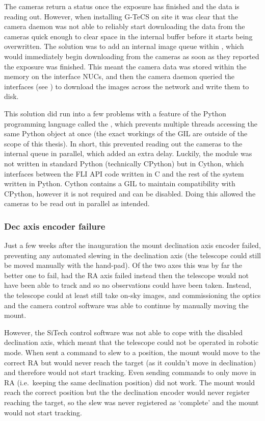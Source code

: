 \begin{colsection}
\begin{colsection}
The cameras return a  status once the exposure has finished and the data is reading out. However, when installing G-TeCS on site it was clear that the camera daemon was not able to reliably start downloading the data from the cameras quick enough to clear space in the internal buffer before it starts being overwritten. The solution was to add an internal image queue within , which would immediately begin downloading from the cameras as soon as they reported the exposure was finished. This meant the camera data was stored within the memory on the interface NUCs, and then the camera daemon queried the  interfaces (see ) to download the images across the network and write them to disk.

This solution did run into a few problems with a feature of the Python programming language called the , which prevents multiple threads accessing the same Python object at once (the exact workings of the GIL are outside of the scope of this thesis). In short, this prevented reading out the cameras to the internal queue in parallel, which added an extra delay. Luckily, the  module was not written in standard Python (technically CPython) but in Cython, which interfaces between the FLI API code written in C and the rest of the system written in Python. Cython contains a GIL to maintain compatibility with CPython, however it is not required and can be disabled. Doing this allowed the cameras to be read out in parallel as intended.

\subsubsection{Dec axis encoder failure}

Just a few weeks after the inauguration the mount declination axis encoder failed, preventing any automated slewing in the declination axis (the telescope could still be moved manually with the hand-pad). Of the two axes this was by far the better one to fail, had the RA axis failed instead then the telescope would not have been able to track and so no observations could have been taken. Instead, the telescope could at least still take on-sky images, and commissioning the optics and the camera control software was able to continue by manually moving the mount.

However, the SiTech control software was not able to cope with the disabled declination axis, which meant that the telescope could not be operated in robotic mode. When sent a command to slew to a position, the mount would move to the correct RA but would never reach the target (as it couldn't move in declination) and therefore would not start tracking. Even sending commands to only move in RA (i.e.\ keeping the same declination position) did not work. The mount would reach the correct position but the the declination encoder would never register reaching the target, so the slew was never registered as `complete' and the mount would not start tracking.


\end{colsection}
\end{colsection}
